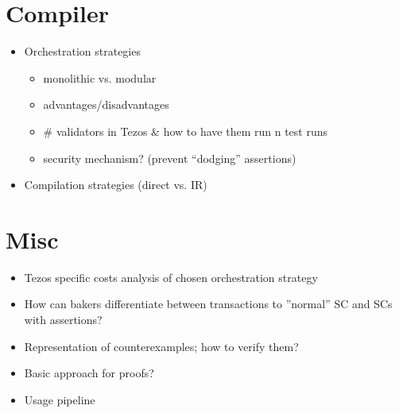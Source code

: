 \section{Compiler}
\draft{}
\begin{itemize}
\item Orchestration strategies
	\begin{itemize}
	\item monolithic vs. modular
	\item advantages/disadvantages
	\item \# validators in Tezos \& how to have them run n test runs
	\item security mechanism? (prevent ``dodging'' assertions)
	\end{itemize}
\item Compilation strategies (direct vs. IR)
\end{itemize}

\section{Misc}
\begin{itemize}
\item Tezos specific costs analysis of chosen orchestration strategy
\item How can bakers differentiate between transactions to ”normal” SC and SCs with assertions?
\item Representation of counterexamples; how to verify them?
\item Basic approach for proofs?
\item Usage pipeline
\end{itemize}



 